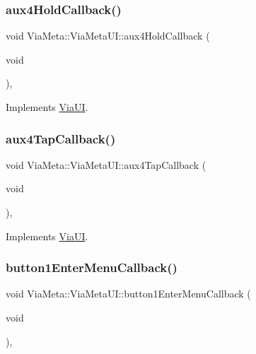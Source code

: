\subsubsection{\texorpdfstring{aux4\+Hold\+Callback()}{aux4HoldCallback()}}
{\footnotesize\ttfamily void Via\+Meta\+::\+Via\+Meta\+U\+I\+::aux4\+Hold\+Callback (\begin{DoxyParamCaption}\item[{void}]{ }\end{DoxyParamCaption})\hspace{0.3cm}{\ttfamily [override]}, {\ttfamily [virtual]}}



Implements \mbox{\hyperlink{class_via_u_i_a884790ab6dac8e6f49104146ff620512}{Via\+UI}}.

\mbox{\label{class_via_meta_1_1_via_meta_u_i_ad8e6300990d654091672b0f94a9b47d8}} 
\subsubsection{\texorpdfstring{aux4\+Tap\+Callback()}{aux4TapCallback()}}
{\footnotesize\ttfamily void Via\+Meta\+::\+Via\+Meta\+U\+I\+::aux4\+Tap\+Callback (\begin{DoxyParamCaption}\item[{void}]{ }\end{DoxyParamCaption})\hspace{0.3cm}{\ttfamily [override]}, {\ttfamily [virtual]}}



Implements \mbox{\hyperlink{class_via_u_i_a0a43c527f027d11b266080d8cacb1d65}{Via\+UI}}.

\mbox{\label{class_via_meta_1_1_via_meta_u_i_a5e9d82c9c06759dd2cc3b48846e594f2}} 
\subsubsection{\texorpdfstring{button1\+Enter\+Menu\+Callback()}{button1EnterMenuCallback()}}
{\footnotesize\ttfamily void Via\+Meta\+::\+Via\+Meta\+U\+I\+::button1\+Enter\+Menu\+Callback (\begin{DoxyParamCaption}\item[{void}]{ }\end{DoxyParamCaption})\hspace{0.3cm}{\ttfamily [override]}, {\ttfamily [virtual]}}



